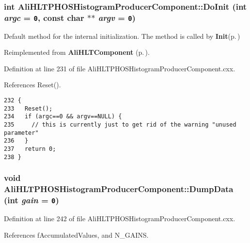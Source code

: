 \subsubsection{\setlength{\rightskip}{0pt plus 5cm}int Ali\-HLTPHOSHistogram\-Producer\-Component::Do\-Init (int {\em argc} = {\tt 0}, const char $\ast$$\ast$ {\em argv} = {\tt 0})\hspace{0.3cm}{\tt  [virtual]}}\label{classAliHLTPHOSHistogramProducerComponent_a4}


Default method for the internal initialization. The method is called by {\bf Init}{\rm (p.\,\pageref{classAliHLTProcessor_a2})} 

Reimplemented from {\bf Ali\-HLTComponent} {\rm (p.\,\pageref{classAliHLTComponent_b5})}.

Definition at line 231 of file Ali\-HLTPHOSHistogram\-Producer\-Component.cxx.

References Reset().

\footnotesize\begin{verbatim}232 {
233   Reset();
234   if (argc==0 && argv==NULL) {
235     // this is currently just to get rid of the warning "unused parameter"
236   }
237   return 0;
238 }
\end{verbatim}\normalsize 


\subsubsection{\setlength{\rightskip}{0pt plus 5cm}void Ali\-HLTPHOSHistogram\-Producer\-Component::Dump\-Data (int {\em gain} = {\tt 0})}\label{classAliHLTPHOSHistogramProducerComponent_a8}




Definition at line 242 of file Ali\-HLTPHOSHistogram\-Producer\-Component.cxx.

References f\-Accumulated\-Values, and N\_\-GAINS.

